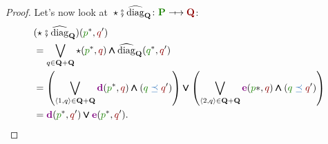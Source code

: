 \begin{proof}
    Let's now look at~$\star \then \comp{\diag}_\posgenB\colon \funposA \profto \resposB$:
    \begin{equation}
        \begin{aligned}
             & (\star \then \comp{\diag}_\posgenB)(\funposAel^*,\resposBel')                                                                                       \\
             & =\bigvee_{\posgenBel\in \posgenB+\posgenB} \star(\funposAel^*,\resposBel)\booland \comp{\diag}_\posgenB(\funposBel^*,\resposBel')                   \\
             & =\left(\bigvee_{\disunionA{\posgenBel}\in \posgenB+\posgenB} \adpa(\funposAel^*,\resposBel) \booland (\funposBel\posleq \resposBel')\right) \boolor
            \left(\bigvee_{\disunionB{\posgenBel}\in \posgenB+\posgenB} \adpb(\funposAel*,\resposBel) \booland (\funposBel\posleq \resposBel')\right)              \\
             & =\adpa(\funposAel^*,\resposBel')\boolor \adpb(\funposAel^*,\resposBel').
        \end{aligned}
    \end{equation}
\end{proof}


